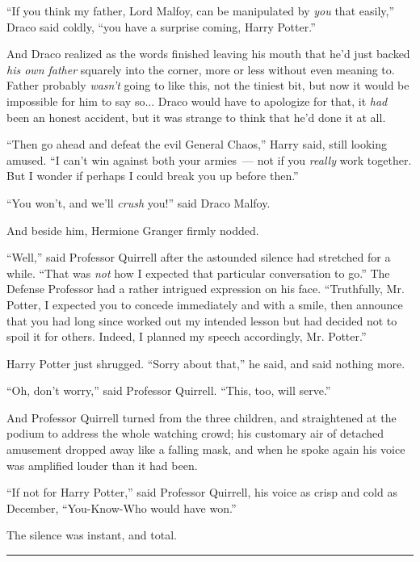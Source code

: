 ``If you think my father, Lord Malfoy, can be manipulated by \emph{you} that easily,'' Draco said coldly, ``you have a surprise coming, Harry Potter.''

And Draco realized as the words finished leaving his mouth that he'd just backed \emph{his own father} squarely into the corner, more or less without even meaning to. Father probably \emph{wasn't} going to like this, not the tiniest bit, but now it would be impossible for him to say so... Draco would have to apologize for that, it \emph{had} been an honest accident, but it was strange to think that he'd done it at all.

``Then go ahead and defeat the evil General Chaos,'' Harry said, still looking amused. ``I can't win against both your armies~--- not if you \emph{really} work together. But I wonder if perhaps I could break you up before then.''

``You won't, and we'll \emph{crush} you!'' said Draco Malfoy.

And beside him, Hermione Granger firmly nodded.

``Well,'' said Professor Quirrell after the astounded silence had stretched for a while. ``That was \emph{not} how I expected that particular conversation to go.'' The Defense Professor had a rather intrigued expression on his face. ``Truthfully, Mr. Potter, I expected you to concede immediately and with a smile, then announce that you had long since worked out my intended lesson but had decided not to spoil it for others. Indeed, I planned my speech accordingly, Mr. Potter.''

Harry Potter just shrugged. ``Sorry about that,'' he said, and said nothing more.

``Oh, don't worry,'' said Professor Quirrell. ``This, too, will serve.''

And Professor Quirrell turned from the three children, and straightened at the podium to address the whole watching crowd; his customary air of detached amusement dropped away like a falling mask, and when he spoke again his voice was amplified louder than it had been.

``If not for Harry Potter,'' said Professor Quirrell, his voice as crisp and cold as December, ``You-Know-Who would have won.''

The silence was instant, and total.

\begin{center}\rule{3in}{0.4pt}\end{center}

